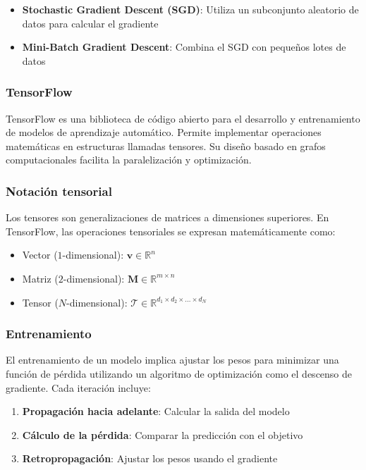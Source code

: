 \documentclass[../main.tex]{subfiles}
\begin{document}
\begin{itemize}
    \item \textbf{Stochastic Gradient Descent (SGD)}: Utiliza un subconjunto aleatorio de datos para calcular el gradiente
    \item \textbf{Mini-Batch Gradient Descent}: Combina el SGD con pequeños lotes de datos
\end{itemize}

\subsubsection{TensorFlow}

TensorFlow es una biblioteca de código abierto para el desarrollo y entrenamiento de modelos de aprendizaje automático. Permite implementar operaciones matemáticas en estructuras llamadas tensores. Su diseño basado en grafos computacionales facilita la paralelización y optimización.

\subsubsection{Notación tensorial}

Los tensores son generalizaciones de matrices a dimensiones superiores. En TensorFlow, las operaciones tensoriales se expresan matemáticamente como:

\begin{itemize}
    \item Vector (\(1\)-dimensional): \( \mathbf{v} \in \mathbb{R}^n \)
    \item Matriz (\(2\)-dimensional): \( \mathbf{M} \in \mathbb{R}^{m \times n} \)
    \item Tensor (\(N\)-dimensional): \( \mathcal{T} \in \mathbb{R}^{d_1 \times d_2 \times \ldots \times d_N} \)
\end{itemize}

\subsubsection{Entrenamiento}

El entrenamiento de un modelo implica ajustar los pesos para minimizar una función de pérdida utilizando un algoritmo de optimización como el descenso de gradiente. Cada iteración incluye:

\begin{enumerate}
    \item \textbf{Propagación hacia adelante}: Calcular la salida del modelo
    \item \textbf{Cálculo de la pérdida}: Comparar la predicción con el objetivo
    \item \textbf{Retropropagación}: Ajustar los pesos usando el gradiente
\end{enumerate}
\end{document}
